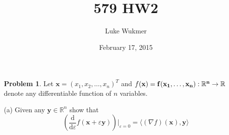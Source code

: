 \documentclass[10pt]{article}
\theoremstyle{plain}
\theoremstyle{definition}
\newtheorem{prob}{Problem}
\providecommand{\R}{\mathbb{R}}%
\numberwithin{equation}{section}
\renewcommand{\epsilon}{\varepsilon}
\begin{document}
\lstset{language=Python}

\title{\Large{579 HW2}}
\author{Luke Wukmer}
\date{February 17, 2015}
\maketitle \normalsize \thispagestyle{empty} %

\begin{prob}
Let $\mathbf{x} = ( x_1, x_2, \dots , x_n )^T$ and $f(\bf{x}) = f(x_1, \dots, x_n) : \R^n \rightarrow \R$ denote any differentiable function of $n$ variables.

(a) Given any $\mathbf{y} \in \R^n$ show that
\[
\left(\frac{\mathrm{d}}{\mathrm{d}\epsilon} f(\mathbf{x} + \epsilon \mathbf{y}) \right)\Big|_{\epsilon=0}  =
\big\langle(\nabla f) (\mathbf{x}) ,  \mathbf{y} \big\rangle
\]

 
\end{prob}
\end{document}
